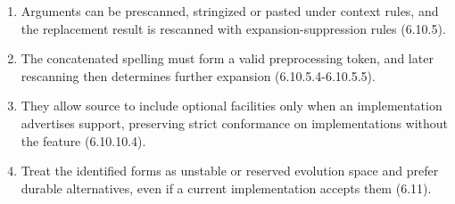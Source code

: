 \documentclass[10pt,letterpaper]{article}
\begin{document}
\begin{enumerate}
  \item Arguments can be prescanned, stringized or pasted under context rules, and the replacement result is rescanned with expansion-suppression rules (6.10.5).

  \item The concatenated spelling must form a valid preprocessing token, and later rescanning then determines further expansion (6.10.5.4-6.10.5.5).

  \item They allow source to include optional facilities only when an implementation advertises support, preserving strict conformance on implementations without the feature (6.10.10.4).

  \item Treat the identified forms as unstable or reserved evolution space and prefer durable alternatives, even if a current implementation accepts them (6.11).
\end{enumerate}
\end{document}
